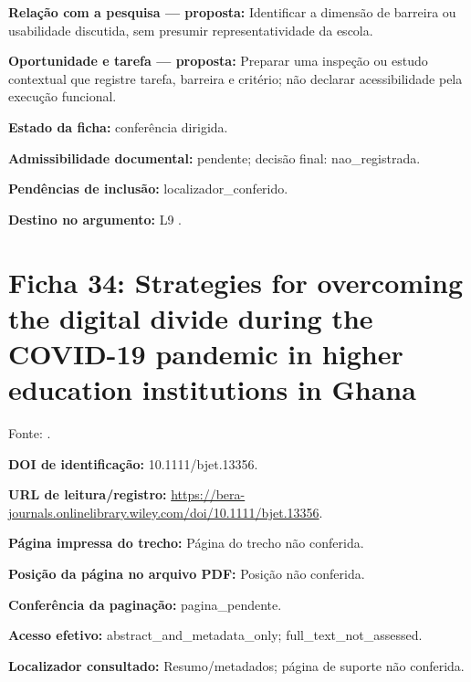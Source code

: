 \noindent\textbf{Relação com a pesquisa — proposta:} Identificar a dimensão de barreira ou usabilidade discutida, sem presumir representatividade da escola.\par\medskip

\noindent\textbf{Oportunidade e tarefa — proposta:} Preparar uma inspeção ou estudo contextual que registre tarefa, barreira e critério; não declarar acessibilidade pela execução funcional.\par\medskip

\noindent\textbf{Estado da ficha:} conferência dirigida.\par\medskip

\noindent\textbf{Admissibilidade documental:} pendente; decisão final: nao\_registrada.\par\medskip

\noindent\textbf{Pendências de inclusão:} localizador\_conferido.\par\medskip

\noindent\textbf{Destino no argumento:} L9 .

\clearpage\section*{Ficha 34: Strategies for overcoming the digital divide during the COVID-19 pandemic in higher education institutions in Ghana}

Fonte: \citet{kumiyeboah2023}.

\noindent\textbf{DOI de identificação:} 10.1111/bjet.13356.\par\medskip

\noindent\textbf{URL de leitura/registro:} \url{https://bera-journals.onlinelibrary.wiley.com/doi/10.1111/bjet.13356}.\par\medskip

\noindent\textbf{Página impressa do trecho:} Página do trecho não conferida.\par\medskip

\noindent\textbf{Posição da página no arquivo PDF:} Posição não conferida.\par\medskip

\noindent\textbf{Conferência da paginação:} pagina\_pendente.\par\medskip

\noindent\textbf{Acesso efetivo:} abstract\_and\_metadata\_only; full\_text\_not\_assessed.\par\medskip

\noindent\textbf{Localizador consultado:} Resumo/metadados; página de suporte não conferida.\par\medskip

